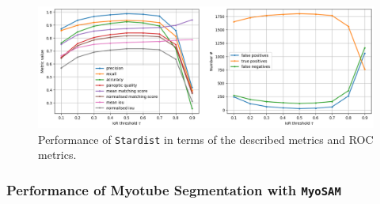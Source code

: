 \begin{figure}
	\centering
	\includegraphics[width=\textwidth]{"images/quantitative_performance_stardist.png"}
	\caption[Quantitative performance \texttt{Stardist}]{Performance of \texttt{Stardist} in terms of the described metrics and ROC metrics.}
	\label{figperfstardist}
\end{figure} 


\subsubsection{Performance of Myotube Segmentation with \texttt{MyoSAM}}

